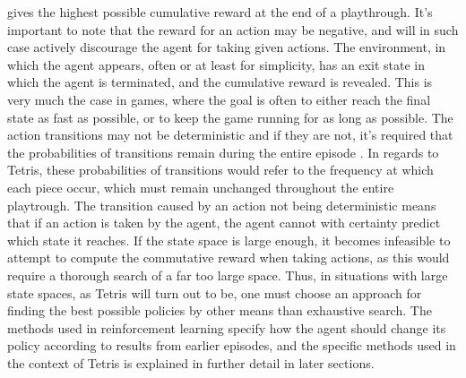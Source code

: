 gives the highest possible cumulative reward at the end of a playthrough. 
It's important to note that the reward 
for an action may be negative, and will in such case actively discourage 
the agent for taking given actions.
The environment, in which the agent appears, often 
or at least for simplicity, has an exit state
in which the agent is terminated, and the cumulative reward 
is revealed. This is very much the case in games, where the goal 
is often to either reach the final state as fast as possible,
or to keep the game running for as long as possible.
The action transitions may 
not be deterministic and if they are not,
it's required that the probabilities of transitions
remain during the entire episode \citep{Carr}. In regards to Tetris, these probabilities of
transitions would refer to the frequency at which each piece occur, which must remain
unchanged throughout the entire playtrough.
The transition caused by an action not being deterministic
means that if an action is taken by the agent, the agent cannot 
with certainty predict which state it reaches.
If the state space 
is large enough, it becomes infeasible to attempt to compute 
the commutative reward when taking actions, as this would require
a thorough search of a far too large space. Thus, in situations 
with large state spaces, as Tetris will turn out to be, one must choose 
an approach for finding the best possible policies by other
means than exhaustive search. 
The methods used in reinforcement learning 
specify how the agent should change its policy according to 
results from earlier episodes, and the specific methods used in
the context of Tetris is explained in further detail in later sections.













